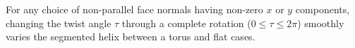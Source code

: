 \documentclass{svproc}
\begin{document}
\begin{theorem}
  For any choice of non-parallel face normals having non-zero $x$ or $y$ components,
  changing the twist angle $\tau$ through a complete rotation ($0 \leq \tau \leq 2\pi$)
  smoothly varies the segmented helix
  between a torus and flat cases.
\end{theorem}









\end{document}
